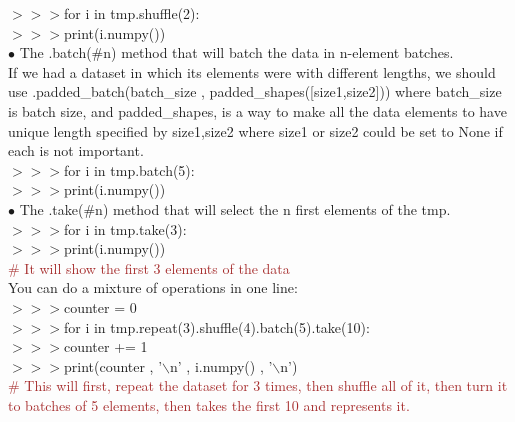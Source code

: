\documentclass[a4paper,18pt]{article}
\begin{document}
{{{{{{{{{{{{{{{{{{{{{{{{{{$>>>$for i in tmp.shuffle(2):\\

$>>>$\hspace*{14pt}print(i.numpy())\\

\hspace*{10pt}$\bullet$ The .batch(\#n) method that will batch the data in n-element batches.\\ If we had a dataset in which its elements were with different lengths, we should use .padded\_batch(batch\_size , padded\_shapes([size1,size2])) where batch\_size is batch size, and padded\_shapes, is a way to make all the data elements to have unique length specified by size1,size2 where size1 or size2 could be set to None if each is not important.\\

$>>>$for i in tmp.batch(5):\\

$>>>$\hspace*{14pt}print(i.numpy())\\

\hspace*{10pt}$\bullet$ The .take(\#n) method that will select the n first elements of the tmp.\\

$>>>$for i in tmp.take(3):\\

$>>>$\hspace*{14pt}print(i.numpy())\\{\textcolor{brown}{\# It will show the first 3 elements of the data}}\\

You can do a mixture of operations in one line:\\

$>>>$counter = 0\\

$>>>$for i in tmp.repeat(3).shuffle(4).batch(5).take(10):\\

$>>>$\hspace*{14pt}counter += 1\\

$>>>$\hspace*{14pt}print(counter , '$\backslash$n' , i.numpy() , '$\backslash$n')\\

{\textcolor{brown}{\# This will first, repeat the dataset for 3 times, then shuffle all of it, then turn it to batches of 5 elements, then takes the first 10 and represents it.}}\\

}}}}}}}}}}}}}}}}}}}}}}}}}}
\end{document}
